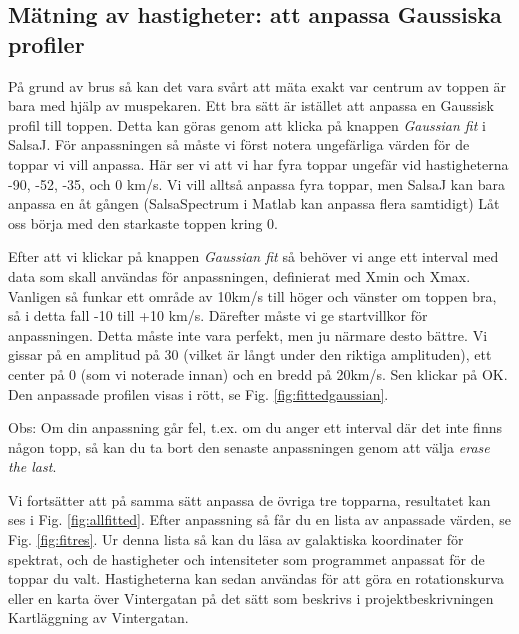 \documentclass[11pt,swedish,a4paper]{article}
\begin{document}
\subsection{Mätning av hastigheter: att anpassa Gaussiska profiler}
På grund av brus så kan det vara svårt att mäta exakt var centrum av toppen är
bara med hjälp av muspekaren. Ett bra sätt är istället att anpassa en Gaussisk
profil till toppen.  Detta kan göras genom att klicka på knappen \emph{Gaussian
fit} i SalsaJ.  För anpassningen så måste vi först notera ungefärliga värden
för de toppar vi vill anpassa. Här ser vi att vi har fyra toppar ungefär vid
hastigheterna -90, -52, -35, och 0 km/s. Vi vill alltså anpassa fyra toppar,
men SalsaJ kan bara anpassa en åt gången (SalsaSpectrum i Matlab kan anpassa
flera samtidigt) Låt oss börja med den starkaste toppen kring 0.

Efter att vi klickar på knappen \emph{Gaussian fit} så behöver vi ange ett interval 
med data som skall användas för anpassningen, definierat med Xmin och Xmax. Vanligen så
funkar ett område av 10km/s till höger och vänster om toppen bra, så i detta fall 
-10 till +10 km/s. Därefter måste vi ge startvillkor för anpassningen. Detta måste inte vara
perfekt, men ju närmare desto bättre. Vi gissar på en amplitud på 30 (vilket är långt
under den riktiga amplituden), ett center på 0 (som vi noterade innan) och en bredd på
20km/s. Sen klickar på OK. Den anpassade profilen visas i rött, se Fig. 
\ref{fig:fittedgaussian}. 

Obs: Om din anpassning går fel, t.ex. om du anger ett interval där det inte
finns någon topp, så kan du ta bort den senaste anpassningen genom att välja
\emph{erase the last}. 

Vi fortsätter att på samma sätt anpassa de övriga tre topparna, resultatet kan
ses i Fig.  \ref{fig:allfitted}. Efter anpassning så får du en lista av
anpassade värden, se Fig.  \ref{fig:fitres}. Ur denna lista så kan du läsa av
galaktiska koordinater för spektrat, och de hastigheter och intensiteter som
programmet anpassat för de toppar du valt.  Hastigheterna kan sedan användas
för att göra en rotationskurva eller en karta över Vintergatan på det sätt som
beskrivs i projektbeskrivningen Kartläggning av Vintergatan. 
\end{document}
